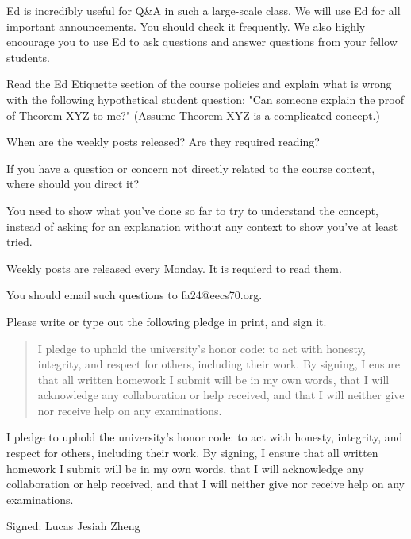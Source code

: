 \documentclass[11pt]{article}
\begin{document}

Ed is incredibly useful for Q\&A in such a large-scale class. We will use Ed for all important announcements. You should check it frequently. We also highly encourage you to use Ed to ask questions and answer questions from your fellow students.

\begin{Parts}
  
    \Part Read the Ed Etiquette section of the course policies and explain what is wrong with the following hypothetical student question: "Can someone explain the proof of Theorem XYZ to me?" (Assume Theorem XYZ is a complicated concept.)

    \Part When are the weekly posts released? Are they required reading?

    \Part If you have a question or concern not directly related to the course content, where should you direct it?

\end{Parts}

\begin{solution}
\begin{Parts}

\Part You need to show what you've done so far to try to understand the concept, instead of asking for an explanation without any context to show you've at least tried.

\Part Weekly posts are released every Monday. It is requierd to read them.

\Part You should email such questions to fa24@eecs70.org.



\end{Parts}
\end{solution}


Please write or type out the following pledge in print, and sign it.

\begin{quote}
I pledge to uphold the university's honor code: to act with honesty, integrity, and respect for others, including their work. By signing, I ensure that all written homework I submit will be in my own words, that I will acknowledge any collaboration or help received, and that I will neither give nor receive help on any examinations. 
\end{quote}

\begin{solution}
  I pledge to uphold the university's honor code: to act with honesty, integrity, and respect for others, including their work. By signing, I ensure that all written homework I submit will be in my own words, that I will acknowledge any collaboration or help received, and that I will neither give nor receive help on any examinations. 

  Signed: Lucas Jesiah Zheng
\end{solution}
\end{document}
